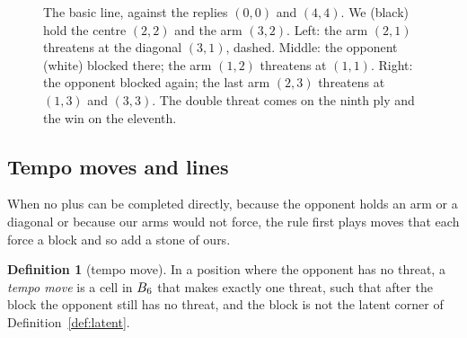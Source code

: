 \documentclass[11pt]{amsart}
\theoremstyle{definition}
\newtheorem{definition}[theorem]{Definition}
\theoremstyle{remark}
\begin{document}
\begin{figure}[ht]
\centering
{}
\hspace{1em}
\hspace{1em}
\caption{The basic line, against the replies $(0,0)$ and $(4,4)$. We
(black) hold the centre $(2,2)$ and the arm $(3,2)$. Left: the arm
$(2,1)$ threatens at the diagonal $(3,1)$, dashed. Middle: the opponent
(white) blocked there; the arm $(1,2)$ threatens at $(1,1)$. Right: the
opponent blocked again; the last arm $(2,3)$ threatens at $(1,3)$ and
$(3,3)$. The double threat comes on the ninth ply and the win on the
eleventh.}
\label{fig:basic}
\end{figure}

\subsection{Tempo moves and lines}

When no plus can be completed directly, because the opponent holds an
arm or a diagonal or because our arms would not force, the rule first
plays moves that each force a block and so add a stone of ours.

\begin{definition}[tempo move]\label{def:tempo}
In a position where the opponent has no threat, a \emph{tempo move} is
a cell in $B_6$ that makes exactly one threat, such that after
the block the opponent still has no threat, and the block is not the
latent corner of Definition~\ref{def:latent}.
\end{definition}
\end{document}
